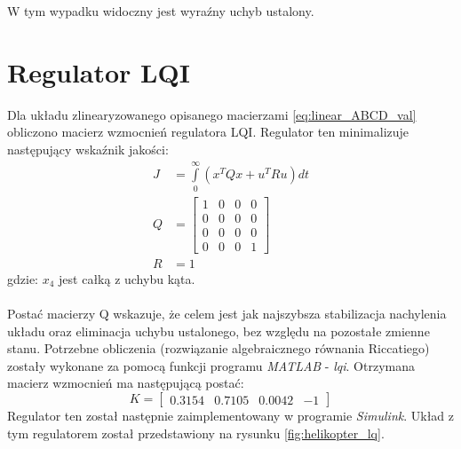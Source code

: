 \documentclass[11pt,a4paper]{article}
\begin{document}
W tym wypadku widoczny jest wyraźny uchyb ustalony.

\section{Regulator LQI}
\label{sec:regulatorlqi}
Dla układu zlinearyzowanego opisanego macierzami \eqref{eq:linear_ABCD_val} obliczono macierz wzmocnień regulatora LQI. Regulator ten minimalizuje następujący wskaźnik jakości:
\begin{equation}
\begin{aligned}
J&=\int\limits_0^{\infty}(x^TQx+u^TRu)dt\\
Q&=\begin{bmatrix}
1 & 0 & 0 & 0\\
0 & 0 & 0 & 0\\
0 & 0 & 0 & 0\\
0 & 0 & 0 & 1
\end{bmatrix}\\
R&=1
\end{aligned}
\end{equation}
\noindent gdzie:\newline
\(x_4\) jest całką z uchybu kąta.
\paragraph*{}
Postać macierzy Q wskazuje, że celem jest jak najszybsza stabilizacja nachylenia układu oraz eliminacja uchybu ustalonego, bez względu na pozostałe zmienne stanu. Potrzebne obliczenia (rozwiązanie algebraicznego równania Riccatiego) zostały wykonane za pomocą funkcji programu \textit{MATLAB} - \textit{lqi}. Otrzymana macierz wzmocnień ma następującą postać:
\begin{equation}
K=\begin{bmatrix}
0.3154 & 0.7105 & 0.0042 & -1
\end{bmatrix}
\end{equation}
Regulator ten został następnie zaimplementowany w programie \textit{Simulink}. Układ z tym regulatorem został przedstawiony na rysunku \ref{fig:helikopter_lq}.
\end{document}
